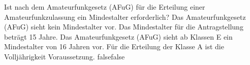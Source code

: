     {Ist nach dem Amateurfunkgesetz (AFuG) für die Erteilung einer Amateurfunkzulassung ein Mindestalter erforderlich?}
    {Das Amateurfunkgesetz (AFuG) sieht kein Mindestalter vor.}
    {Das Mindestalter für die Antragstellung beträgt 15 Jahre.}
    {Das Amateurfunkgesetz (AFuG) sieht ab Klassen E ein Mindestalter von 16 Jahren vor.}
    {Für die Erteilung der Klasse A ist  die Volljährigkeit Voraussetzung.}
    {false}{false}